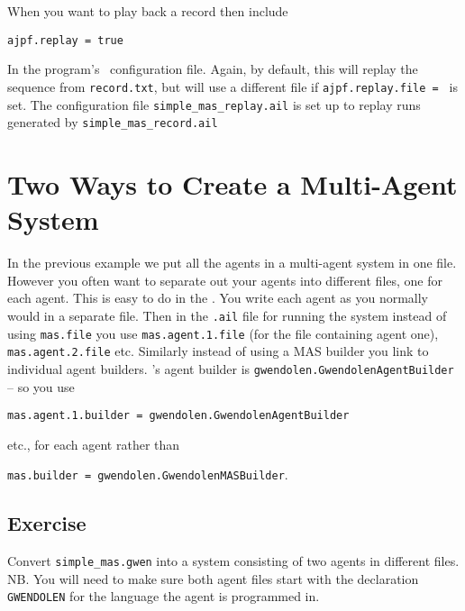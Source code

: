 When you want to play back a record then include 

\begin{verbatim}
ajpf.replay = true
\end{verbatim}

In the program's \ail\ configuration file.  Again, by default, this will replay the sequence from \texttt{record.txt}, but will use a different file if \texttt{ajpf.replay.file = } is set.  The configuration file \texttt{simple\_mas\_replay.ail} is set up to replay runs generated by \texttt{simple\_mas\_record.ail}

\section{Two Ways to Create a Multi-Agent System}

\begin{sloppypar}
In the previous example we put all the agents in a multi-agent system in one file.  However you often want to separate out your agents into different files, one for each agent.  This is easy to do in the \ail.  You write each agent as you normally would in a separate file.  Then in the \texttt{.ail} file for running the system instead of using \texttt{mas.file} you use \texttt{mas.agent.1.file} (for the file containing agent one), \texttt{mas.agent.2.file} etc.  Similarly instead of using a MAS builder you link to individual agent builders.  \gwendolen's agent builder is \texttt{gwendolen.GwendolenAgentBuilder} -- so you use 
\end{sloppypar}
\begin{center}
\texttt{mas.agent.1.builder = gwendolen.GwendolenAgentBuilder} 
\end{center}
etc., for each agent rather than 
\begin{center}
\texttt{mas.builder = gwendolen.GwendolenMASBuilder}.
\end{center}

\subsection{Exercise}
Convert \texttt{simple\_mas.gwen} into a system consisting of two agents in different files.  NB.  You will need to make sure both agent files start with the declaration \texttt{GWENDOLEN} for the language the agent is programmed in.

